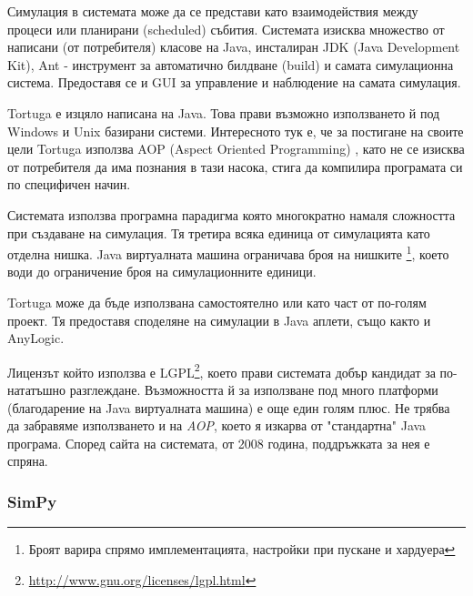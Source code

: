 			
				Симулация в системата може да се представи като взаимодействия между процеси или планирани (scheduled) събития.					Системата изисква множество от написани (от потребителя) класове на Java, инсталиран JDK 
				(Java Development Kit), Ant - инструмент за автоматично билдване (build) и 
				самата симулационна система. Предоставя се и GUI за управление и наблюдение на самата симулация.
			
			
				Tortuga е изцяло написана на Java. Това прави възможно използването й под Windows и Unix базирани системи.
				Интересното тук е, че за постигане на своите цели Tortuga използва AOP (Aspect Oriented Programming)
				\cite{AOP}, като не се изисква от потребителя да има познания в тази насока, стига да компилира 
				програмата си по специфичен начин. 			
			
			
				Системата използва програмна парадигма която многократно намаля сложността при създаване на симулация.
				Тя третира всяка единица от симулацията като отделна нишка. Java виртуалната машина ограничава броя на нишките
				\footnote{Броят варира спрямо имплементацията, настройки при пускане и хардуера}, 
				което води до ограничение броя на симулационните единици.
			
			
	 			Tortuga може да бъде използвана самостоятелно или като част от по-голям проект. 
	 			Тя предоставя споделяне на симулации в Java аплети, също както и AnyLogic.
 			
 			
	 			Лицензът който използва е LGPL\footnote{\url{http://www.gnu.org/licenses/lgpl.html}}, 
	 			което прави системата добър кандидат за по-нататъшно разглеждане.
	 			Възможността й за използване под много платформи (благодарение на Java виртуалната машина) е 
	 			още един голям плюс.
	 			Не трябва да забравяме използването и на \emph{AOP}, което я изкарва от "стандартна" Java програма.
	 			Според сайта на системата, от 2008 година, поддръжката за нея е спряна. \cite{Tortuga}
					
		\subsubsection{SimPy}
			
